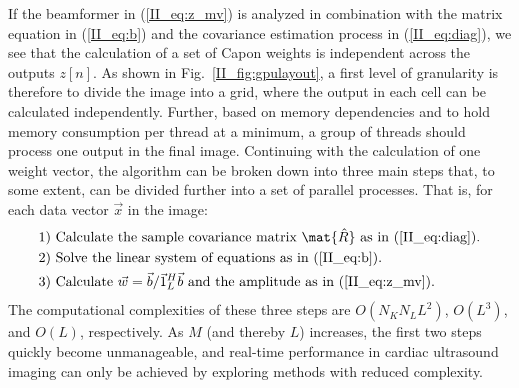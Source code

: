 If the beamformer in (\ref{II_eq:z_mv}) is analyzed in combination with the matrix equation in (\ref{II_eq:b}) and the covariance estimation process in (\ref{II_eq:diag}), we see that the calculation of a set of Capon weights is independent across the outputs $z[n]$. As shown in Fig.\ \ref{II_fig:gpulayout}, a first level of granularity is therefore to divide the image into a grid, where the output in each cell can be calculated independently. Further, based on memory dependencies and to hold memory consumption per thread at a minimum, a group of threads should process one output in the final image. Continuing with the calculation of one weight vector, the algorithm can be broken down into three main steps that, to some extent, can be divided further into a set of parallel processes. That is, for each data vector $\vec{x}$ in the image:
\begin{align*}
\text{1) } &\text{Calculate the sample covariance matrix } \mat{\hat{R}} \text{ as in } \text{(\ref{II_eq:diag})}.\\
\text{2) } &\text{Solve the linear system of equations as in (\ref{II_eq:b}}).\\ %
\text{3) } &\text{Calculate } \vec{w} = \vec{b}/\vec{1}_{L}^H\vec{b} \text{ and the amplitude as in (\ref{II_eq:z_mv})}.
\end{align*}
The computational complexities of these three steps are $O(N_KN_LL^2)$, $O(L^3)$, and $O(L)$, respectively. As $M$ (and thereby $L$) increases, the first two steps quickly become unmanageable, and real-time performance in cardiac ultrasound imaging can only be achieved by exploring methods with reduced complexity.

